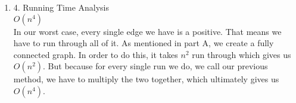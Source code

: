 \documentclass[11pt]{article}
\newenvironment{qparts}{\begin{enumerate}[{(}a{)}]}{\end{enumerate}}
\begin{document}
\begin{qparts}
\begin{qparts}
Given the trade, we should return the tuple that BestTrade() gives us. We know BestTrade works. We run it on the set of valuables V, and we start at the end of the trade because we want to eventually loop back to the valuable we originally started with (we want to get it back but for more). What this means is that if the max is ever higher, we get the better trade off. And if the trade route is better, we should update our values. We attach the starting position to the ending path we get from running BestTrade(). \\

After traversing through all the possible routes for all of the trades that are beneficial, the highest one will return as the max and path values will only change if it satisfies the conditions above. 

\item[4.] Running Time Analysis \\
$O(n^4)$ \\

In our worst case, every single edge we have is a positive. That means we have to run through all of it. As mentioned in part A, we create a fully connected graph. In order to do this, it takes $n^2$ run through which gives us $O(n^2)$. But because for every single run we do, we call our previous method, we have to multiply the two together, which ultimately gives us $O(n^4)$. 
\end{qparts}
\end{qparts}
\newpage
\end{document}
